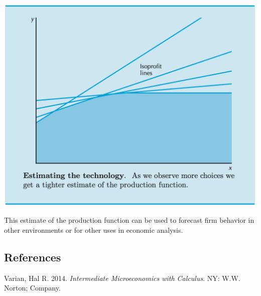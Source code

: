 \documentclass[
]{article}
\newlength{\cslhangindent}
\newlength{\cslentryspacingunit} %
\newenvironment{CSLReferences}[2] %
 {%
  \setlength{\parindent}{0pt}
  \ifodd #1
  \let\oldpar\par
  \def\par{\hangindent=\cslhangindent\oldpar}
  \fi
  \setlength{\parskip}{#2\cslentryspacingunit}
 }%
 {}
\begin{document}
\includegraphics{figures/rev_prof_n.png}

This estimate of the production function can be used to forecast firm
behavior in other environments or for other uses in economic analysis.

\hypertarget{references}{%
\subsection*{References}\label{references}}

\hypertarget{refs}{}
\begin{CSLReferences}{1}{0}
\leavevmode{}%
Varian, Hal R. 2014. \emph{Intermediate Microeconomics with Calculus}.
NY: W.W. Norton; Company.

\end{CSLReferences}
\end{document}
